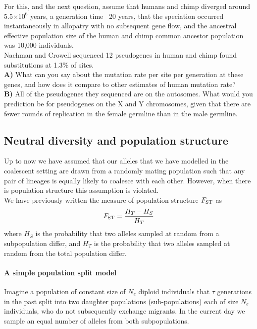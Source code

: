 \begin{question}
For this, and the next question, assume that humans and chimp diverged
around 5.5$\times 10^6$ years, a generation time ~20 years, that the speciation occurred instantaneously in allopatry with no subsequent gene flow, and the ancestral effective population size of the human and chimp common ancestor population was 10,000 individuals.\\
Nachman and Crowell sequenced 12 pseudogenes in human and chimp found substitutions at 1.3\% of sites. \\
{\bf A) } What can you say about the mutation rate per site per generation at these genes, and how does it compare to other estimates of human mutation rate?\\
{\bf B)} All of the pseudogenes they sequenced are on the autosomes. What
would you prediction be for pseudogenes on the X and Y chromosomes,
given that there are fewer rounds of replication in the female
germline than in the male germline.
\end{question}




\subsection{Neutral diversity and population structure}
Up to now we have assumed that our alleles that we have modelled in the
coalescent setting are drawn from a randomly mating population such
that any pair of lineages is equally likely to coalesce with each
other. However, when there is population structure this assumption is
violated. \\

We have previously written the measure of population structure
$F_{\mathrm{ST}}$ as
\begin{equation}
F_{\mathrm{ST}} = \frac{H_T-H_S}{H_T}
\end{equation}
where $H_S$ is the probability that two alleles sampled at random from a
subpopulation differ, and $H_T$ is the probability that two alleles
sampled at random from the total population differ. 

\paragraph{A simple population split model}
Imagine a population of constant size of $N_e$ diploid individuals that
$\tau$ generations in the past split into two daughter populations (sub-populations)
each of size $N_e$ individuals, who do not subsequently exchange
migrants. In the current day we sample an equal number of alleles
from both subpopulations.

